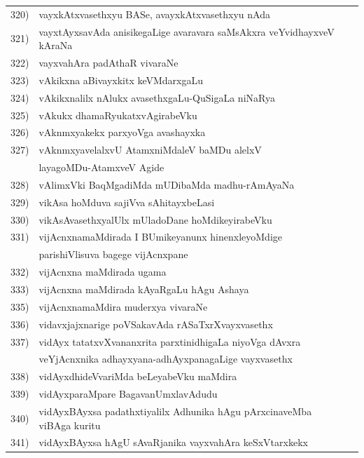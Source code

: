 {\begin{longtable}{@{}cp{7.4cm}r}
320) & vayxkAtxvasethxyu BASe, avayxkAtxvasethxyu nAda & \pageref{page8b}\\
321) & vayxtAyxsavAda anisikegaLige avaravara saMsAkxra veYvidhayxveV kAraNa & \pageref{page176}\\
322) & vayxvahAra padAthaR vivaraNe & \pageref{page23}\\  
323) & vAkikxna aBivayxkitx keVMdarxgaLu & \pageref{page8a}\\
324) & vAkikxnalilx nAlukx avasethxgaLu-QuSigaLa niNaRya & \pageref{page8}\\
325) & vAkukx dhamaRyukatxvAgirabeVku & \pageref{page110}\\
326) & vAknmxyakekx parxyoVga avashayxka & \pageref{page110}\\
327) & vAknmxyavelalxvU AtamxniMdaleV baMDu alelxV  & \\
     & layagoMDu-AtamxveV Agide & \pageref{page195}\\
328) & vAlimxVki BaqMgadiMda mUDibaMda madhu-rAmAyaNa & \pageref{page238}\\
329)  & vikAsa hoMduva sajiVva sAhitayxbeLasi & \pageref{page79}\\ 
330) & vikAsAvasethxyalUlx mUladoDane hoMdikeyirabeVku & \pageref{page178}\\
331) & vijAcnxnamaMdirada I BUmikeyanunx hinenxleyoMdige  & \\
     & parishiVlisuva bagege vijAcnxpane & \pageref{page29a}\\
332) & vijAcnxna maMdirada ugama & \pageref{page65}\\
333) & vijAcnxna maMdirada kAyaRgaLu hAgu Ashaya & \pageref{page22a}\\ 
335) & vijAcnxnamaMdira muderxya vivaraNe & \pageref{page71}\\ 
336) & vidavxjajxnarige poVSakavAda rASaTxrXvayxvasethx & \pageref{page46a}\\
337) & vidAyx tatatxvXvananxrita parxtinidhigaLa niyoVga dAvxra & \\
     & veYjAcnxnika adhayxyana-adhAyxpanagaLige vayxvasethx & \pageref{page55}\\
338) & vidAyxdhideVvariMda beLeyabeVku maMdira & \pageref{page66}\\
339) & vidAyxparaMpare BagavanUmxlavAdudu & \pageref{page70}\\
340) & vidAyxBAyxsa padathxtiyalilx Adhunika hAgu pArxcinaveMba viBAga kuritu & \pageref{page38a}\\
341) & vidAyxBAyxsa hAgU sAvaRjanika vayxvahAra keSxVtarxkekx & \\

\end{longtable}}
